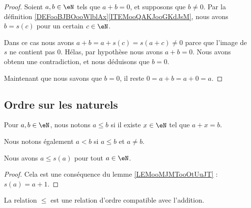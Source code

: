 \begin{proof}
    Soient \( a,b\in \eN\) tels que \( a+b=0\), et supposons que \( b\neq 0\). Par la définition \ref{DEFooBJBOooWlblAx}\ref{ITEMooQAKJooGKdJsM}, nous avons \( b=s(c)\) pour un certain \( c\in \eN\).

    Dans ce cas nous avons \( a+b=a+s(c)=s(a+c)\neq 0\) parce que l'image de \( s\) ne contient pas \( 0\). Hélas, par hypothèse nous avons \( a+b=0\). Nous avons obtenu une contradiction, et nous déduisons que \( b=0\).

    Maintenant que nous savons que \( b=0\), il reste \( 0=a+b=a+0=a\).
\end{proof}

\subsection{Ordre sur les naturels}

\begin{definition}     \label{DEFooAXZSooTEMjlV}
    Pour \( a,b\in \eN\), nous notons \( a\leq b\) si il existe \( x\in \eN\) tel que \( a+x=b\).

    Nous notons également \( a<b \) si \( a\leq b\) et \( a\neq b\).
\end{definition}

\begin{lemma}       \label{LEMooWMYPooLTMyWb}
    Nous avons \( a\leq s(a)\) pour tout \( a\in \eN\).
\end{lemma}

\begin{proof}
    Cela est une conséquence du lemme \ref{LEMooMJMTooOtUuJT} : \( s(a)=a+1\).
\end{proof}

\begin{proposition}     \label{PROPooVXBBooZcghrA}
    La relation \( \leq\) est une relation d'ordre compatible avec l'addition.
\end{proposition}

